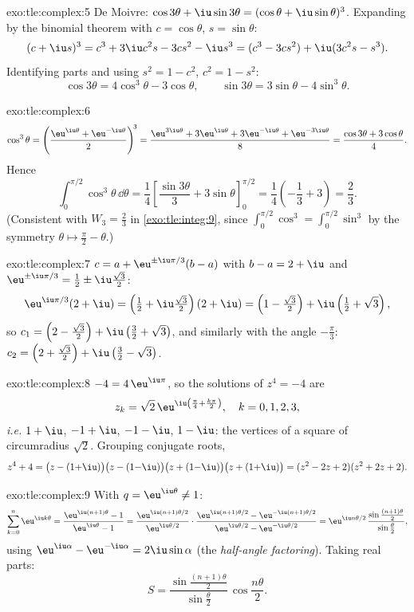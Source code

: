 \begin{solution}{exo:tle:complex:5}
De Moivre: $\cos3\theta + \iu\sin3\theta = (\cos\theta + \iu\sin\theta)^3$.
Expanding by the binomial theorem with $c = \cos\theta$, $s = \sin\theta$:
\[
(c + \iu s)^3 = c^3 + 3\iu c^2 s - 3 c s^2 - \iu s^3
= (c^3 - 3cs^2) + \iu(3c^2 s - s^3).
\]
Identifying parts and using $s^2 = 1 - c^2$, $c^2 = 1 - s^2$:
\[
\cos3\theta = 4\cos^3\theta - 3\cos\theta,
\qquad
\sin3\theta = 3\sin\theta - 4\sin^3\theta .
\]
\end{solution}

\begin{solution}{exo:tle:complex:6}
\[
\cos^3\theta = \left(\frac{\eu^{\iu\theta} + \eu^{-\iu\theta}}{2}\right)^{\!3}
= \frac{\eu^{3\iu\theta} + 3\eu^{\iu\theta} + 3\eu^{-\iu\theta} + \eu^{-3\iu\theta}}{8}
= \frac{\cos3\theta + 3\cos\theta}{4}.
\]
Hence
\[
\int_0^{\pi/2}\cos^3\theta\,\dd\theta
= \frac14\left[\frac{\sin3\theta}{3} + 3\sin\theta\right]_0^{\pi/2}
= \frac14\left(-\frac13 + 3\right) = \frac{2}{3}.
\]
(Consistent with $W_3 = \frac23$ in \cref{exo:tle:integ:9}, since
$\int_0^{\pi/2}\cos^3 = \int_0^{\pi/2}\sin^3$ by the symmetry
$\theta \mapsto \frac\pi2 - \theta$.)
\end{solution}

\begin{solution}{exo:tle:complex:7}
$c = a + \eu^{\pm\iu\pi/3}(b - a)$ with $b - a = 2 + \iu$ and
$\eu^{\pm\iu\pi/3} = \frac12 \pm \iu\frac{\sqrt3}{2}$:
\[
\eu^{\iu\pi/3}(2+\iu) = \left(\tfrac12 + \iu\tfrac{\sqrt3}{2}\right)(2+\iu)
= \left(1 - \tfrac{\sqrt3}{2}\right) + \iu\left(\tfrac12 + \sqrt3\right),
\]
so $c_1 = \left(2 - \frac{\sqrt3}{2}\right) +
\iu\left(\frac32 + \sqrt3\right)$, and similarly with the angle
$-\frac\pi3$:
$c_2 = \left(2 + \frac{\sqrt3}{2}\right) + \iu\left(\frac32 - \sqrt3\right)$.
\end{solution}

\begin{solution}{exo:tle:complex:8}
$-4 = 4\,\eu^{\iu\pi}$, so the solutions of $z^4 = -4$ are
\[
z_k = \sqrt2\,\eu^{\iu\left(\frac\pi4 + \frac{k\pi}{2}\right)},
\quad k = 0, 1, 2, 3,
\]
\emph{i.e.} $1 + \iu$, $-1 + \iu$, $-1 - \iu$, $1 - \iu$: the vertices of a
square of circumradius $\sqrt 2$. Grouping conjugate roots,
\[
z^4 + 4 = \bigl(z - (1{+}\iu)\bigr)\bigl(z - (1{-}\iu)\bigr)
\bigl(z + (1{-}\iu)\bigr)\bigl(z + (1{+}\iu)\bigr)
= (z^2 - 2z + 2)(z^2 + 2z + 2).
\]
\end{solution}

\begin{solution}{exo:tle:complex:9}
With $q = \eu^{\iu\theta} \neq 1$:
\[
\sum_{k=0}^{n} \eu^{\iu k\theta} = \frac{\eu^{\iu(n+1)\theta} - 1}{\eu^{\iu\theta} - 1}
= \frac{\eu^{\iu(n+1)\theta/2}}{\eu^{\iu\theta/2}}
\cdot\frac{\eu^{\iu(n+1)\theta/2} - \eu^{-\iu(n+1)\theta/2}}{\eu^{\iu\theta/2} - \eu^{-\iu\theta/2}}
= \eu^{\iu n\theta/2}\,
\frac{\sin\frac{(n+1)\theta}{2}}{\sin\frac{\theta}{2}},
\]
using $\eu^{\iu\alpha} - \eu^{-\iu\alpha} = 2\iu\sin\alpha$ (the
\emph{half-angle factoring}). Taking real parts:
\[
S = \frac{\sin\frac{(n+1)\theta}{2}}{\sin\frac{\theta}{2}}\,
\cos\frac{n\theta}{2}.
\]
\end{solution}

